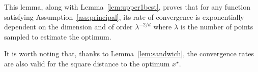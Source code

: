 This lemma, along with Lemma~\ref{lem:upper1best}, proves that for any function satisfying Assumption~\ref{ass:principal}, its rate of convergence is exponentially dependent on the dimension and of order $\lambda^{-2/d}$ where $\lambda$ is the number of points sampled to estimate the optimum. 
\begin{rmq}
It is worth noting that, thanks to Lemma~\ref{lem:sandwich}, the convergence rates are also valid for the square distance to the optimum $x^\star$. 
\end{rmq}

